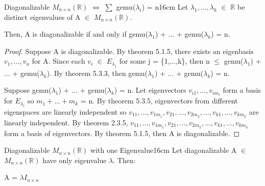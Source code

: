     \newpage



    \begin{corollary}{Diagonalizable $M_{n \times n}(\mathbb{R})$
    $\Leftrightarrow$ $\sum$ gemu($\lambda_i$) = n}{16cm}
        Let $\lambda_1,...,\lambda_k$ $\in$ $\mathbb{R}$ be distinct
        eigenvalues of A $\in$ $M_{n \times n}(\mathbb{R})$.

        Then, A is diagonalizable if and only if
        gemu($\lambda_1$) + ... + gemu($\lambda_k$) = n.
    \end{corollary}

    \begin{proof}
        Suppose A is diagonalizable.
        By {\color{red} theorem 5.1.5}, there exists an eigenbasis
        $v_1,...,v_n$ for A.
        Since each $v_i$ $\in$ $E_{\lambda_j}$ for some j = \{1,...,k\}, then
        n $\leq$ gemu($\lambda_1$) + ... + gemu($\lambda_k$).
        By {\color{red} theorem 5.3.3}, then
        gemu($\lambda_1$) + ... + gemu($\lambda_k$) = n.

        \vspace{0.3cm}

        Suppose gemu($\lambda_1$) + ... + gemu($\lambda_k$) = n.
        Let eigenvectors $v_{i1},...,v_{im_i}$ form a basis for $E_{\lambda_i}$
        so $m_1 + ... + m_k$ = n.
        By {\color{red} theorem 5.3.5}, eigenvectors from different
        eigenspaces are linearly independent so
        $v_{11},...,v_{1m_1},v_{21},...,v_{2m_2},...,v_{k1},...,v_{km_k}$
        are linearly independent.
        By {\color{red} theorem 2.3.5},
        $v_{11},...,v_{1m_1},v_{21},...,v_{2m_2},...,v_{k1},...,v_{km_k}$
        form a basis of eigenvectors.
        By {\color{red} theorem 5.1.5}, then A is diagonalizable.
    \end{proof}

    \vspace{0.5cm}




    \begin{wtheorem}{Diagonalizable $M_{n \times n}(\mathbb{R})$
    with one Eigenvalue}{16cm}
        Let diagonalizable A $\in$ $M_{n \times n}(\mathbb{R})$ have
        only eigenvalue $\lambda$. Then:
        
        \hspace{0.5cm}
        A = $\lambda I_{n \times n}$
    \end{wtheorem}
    
